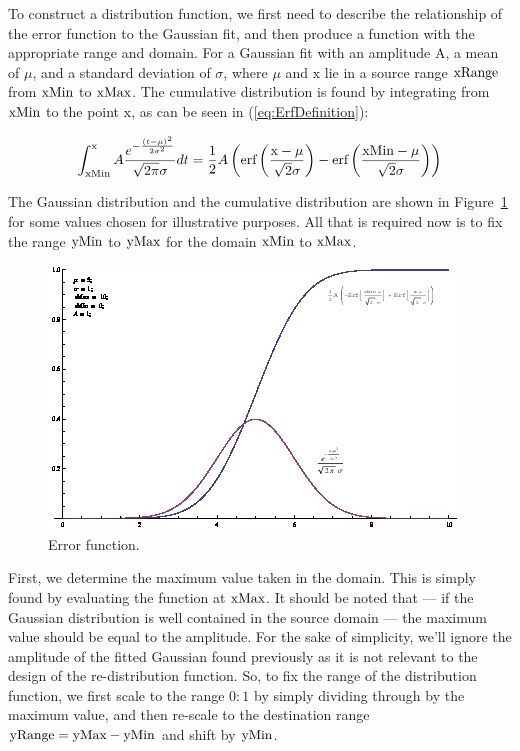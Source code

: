To construct a distribution function, we first need to describe the relationship of the error function to the Gaussian fit, and then produce a function with the appropriate range and domain. For a Gaussian fit with an amplitude A, a mean of $\mu$, and a standard deviation of $\sigma$, where $\mu$ and $\text{x}$ lie in a source range $\text{xRange}$ from $\text{xMin}$ to $\text{xMax}$. The cumulative distribution is found by integrating from $\text{xMin}$ to the point $\text{x}$, as can be seen in (\ref{eq:ErfDefinition}):

\begin{equation}\label{eq:ErfDefinition}
  \int _{\text{xMin}}^{\text{x}} A \frac{e^{-\frac{(t-\mu )^2}{2 \sigma ^2}}}{\sqrt{2 \pi } \sigma }dt = 
  \frac{1}{2} A \left(\text{erf}\left(\frac{\text{x}-\mu }{\sqrt{2} \sigma }\right)-\text{erf}\left(\frac{\text{xMin}-\mu }{\sqrt{2} \sigma }\right)\right)
\end{equation}

The Gaussian distribution and the cumulative distribution are shown in Figure~\ref{fig:ErrorFunctionGraph} for some values chosen for illustrative purposes. All that is required now is to fix the range $\text{yMin}$ to $\text{yMax}$ for the domain $\text{xMin}$ to $\text{xMax}$.

\begin{figure}[h!] %
  \caption{Error function.}  \label{fig:ErrorFunctionGraph}
  \centering
    \includegraphics[width=\textwidth]{Chapter2/Figs/errorFunction.jpg}
\end{figure}

First, we determine the maximum value taken in the domain. This is simply found by evaluating the function at $\text{xMax}$. It should be noted that --- if the Gaussian distribution is well contained in the source domain --- the maximum value should be equal to the amplitude. For the sake of simplicity, we'll ignore the amplitude of the fitted Gaussian found previously as it is not relevant to the design of the re-distribution function. So, to fix the range of the distribution function, we first scale to the range $0:1$ by simply dividing through by the maximum value, and then re-scale to the destination range $\text{yRange} = \text{yMax} - \text{yMin}$ and shift by $\text{yMin}$.


